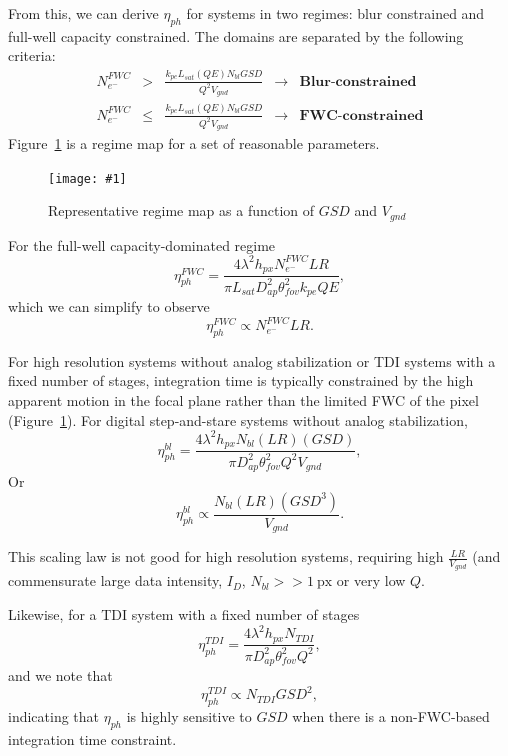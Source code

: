 \documentclass[]{spieman}  %
\newcommand{\includefigure}[3]
{
  \begin{figure}[h!tb]
  \centering
  \texttt{[image: \#1]}
  \caption[]{#3}
  \label{#2}
  \end{figure}
}
\begin{document}
From this, we can derive $\eta_{ph}$ for systems in two regimes: blur constrained and full-well capacity constrained.  The domains are separated by the following criteria:
\begin{align*}
    N_{e^-}^{FWC} &>& \frac{k_{pe}L_{sat}(QE) N_{bl} GSD}{Q^2 V_{gnd}} & \rightarrow &  \textbf{Blur-constrained} \\
    N_{e^-}^{FWC} &\leq& \frac{k_{pe}L_{sat}(QE) N_{bl} GSD}{Q^2 V_{gnd}} & \rightarrow &  \textbf{FWC-constrained}
\end{align*}
Figure~\ref{fig:eta_regime} is a regime map for a set of reasonable parameters.

\includefigure{figures/blur_fwc_regime.pgf}{fig:eta_regime}{Representative regime map as a function of $GSD$ and $V_{gnd}$}

For the full-well capacity-dominated regime
\begin{equation}
    \label{eq:eta_ph_fwc}
    \eta_{ph}^{FWC} = \frac{4\lambda^2 h_{px} N_{e^-}^{FWC} LR}{\pi L_{sat} D_{ap}^2 \theta_{fov}^2 k_{pe}QE},
\end{equation}
which we can simplify to observe
\begin{equation}
    \label{eq:eta_fwc_scaling}
    \eta_{ph}^{FWC} \propto N_{e^-}^{FWC} LR.
\end{equation}

For high resolution systems without analog stabilization or TDI systems with a fixed number of stages, integration time is typically constrained by the high apparent motion in the focal plane rather than the limited FWC of the pixel (Figure~\ref{fig:eta_regime}).  For digital step-and-stare systems without analog stabilization,
\begin{equation}
    \label{eq:eta_ph_blur}
    \eta_{ph}^{bl} = \frac{4\lambda^2 h_{px}N_{bl}(LR)(GSD)}{\pi D_{ap}^2\theta_{fov}^2 Q^2 V_{gnd}},
\end{equation}
Or 
\begin{equation}
    \label{eq:eta_blur_scaling}
    \eta_{ph}^{bl} \propto  \frac{N_{bl} (LR) (GSD^3)}{V_{gnd}}.
\end{equation}

This scaling law is not good for high resolution systems, requiring high $\frac{LR}{V_{gnd}}$ (and commensurate large data intensity, $I_{D}$, $N_{bl} >> 1 \: \textrm{px}$ or very low $Q$.

Likewise, for a TDI system with a fixed number of stages
\begin{equation}
    \eta_{ph}^{TDI} = \frac{4\lambda^2 h_{px} N_{TDI}}{\pi D_{ap}^2 \theta_{fov}^2 Q^2},
\end{equation}
and we note that 
\begin{equation}
    \label{eq:eta_ph_tdi_scaling}
    \eta_{ph}^{TDI} \propto N_{TDI} GSD^2,
\end{equation}
indicating that $\eta_{ph}$ is highly sensitive to $GSD$ when there is a non-FWC-based integration time constraint.
\end{document}
